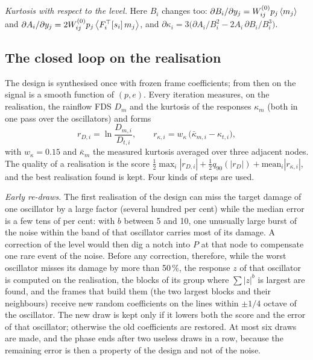 \emph{Kurtosis with respect to the level.} Here $B_i$ changes too: $\partial B_i/\partial y_j =
W^{(0)}_{ij}p_j\left\langle m_j \right\rangle$ and $\partial A_i/\partial y_j = 2W^{(0)}_{ij}p_j\left\langle F_i^\top[s_i]\,m_j \right\rangle$,
and $\partial\kappa_i = 3\bigl(\partial A_i/B_i^2 - 2A_i\,\partial B_i/B_i^3\bigr)$.

\subsection{The closed loop on the realisation}\label{sec:mmvsdloop}

The design is synthesised once with frozen frame coefficients; from then on the signal is a smooth
function of $(p,e)$. Every iteration measures, on the realisation, the rainflow FDS $D_{m}$ and the
kurtosis of the responses $\kappa_{m}$ (both in one pass over the oscillators) and forms
\begin{equation}
  r_{D,i} = \ln\frac{D_{m,i}}{D_{t,i}},\qquad r_{\kappa,i} = w_\kappa\,\bigl(\bar\kappa_{m,i}-\kappa_{t,i}\bigr),
\end{equation}
with $w_\kappa = 0.15$ and $\bar\kappa_m$ the measured kurtosis averaged over three adjacent nodes.
The quality of a realisation is the score $\tfrac12\max_i|r_{D,i}| + \tfrac12q_{90}(|r_D|) +
\mathrm{mean}_i|r_{\kappa,i}|$, and the best realisation found is kept. Four kinds of steps are used.

\emph{Early re-draws.} The first realisation of the design can miss the target damage of one
oscillator by a large factor (several hundred per cent) while the median error is a few tens of per
cent: with $b$ between 5 and 10, one unusually large burst of the noise within the band of that
oscillator carries most of its damage. A correction of the level would then dig a notch into $P$ at
that node to compensate one rare event of the noise. Before any correction, therefore, while the worst
oscillator misses its damage by more than 50\,\%, the response $z$ of that oscillator is computed on
the realisation, the blocks of its group where $\sum|z|^b$ is largest are found, and the frames that
build them (the two largest blocks and their neighbours) receive new random coefficients on the lines
within $\pm1/4$ octave of the oscillator. The new draw is kept only if it lowers both the score and
the error of that oscillator; otherwise the old coefficients are restored. At most six draws are made,
and the phase ends after two useless draws in a row, because the remaining error is then a property
of the design and not of the noise.

